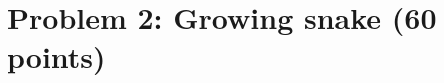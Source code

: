 \documentclass{article}
\begin{document}
%

\section*{Problem 2: Growing snake (60 points)}
\end{document}

